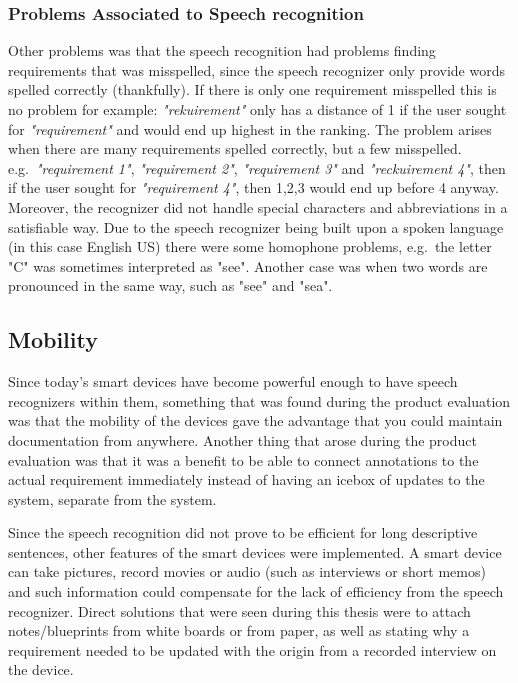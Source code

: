 \subsubsection{Problems Associated to Speech recognition}
Other problems was that the speech recognition had problems finding requirements that was misspelled, since the speech recognizer only provide words spelled correctly (thankfully). If there is only one requirement misspelled this is no problem for example: \emph{"re\emph{k}uirement"} only has a distance of 1 if the user sought for \emph{"requirement"} and would end up highest in the ranking. The problem arises when there are many requirements spelled correctly, but a few misspelled. e.g.\ \emph{"requirement 1"}, \emph{"requirement 2"}, \emph{"requirement 3"} and \emph{"re\emph{ck}uirement 4"}, then if the user sought for \emph{"requirement 4"}, then 1,2,3 would end up before 4 anyway. Moreover, the recognizer did not handle special characters and abbreviations in a satisfiable way. Due to the speech recognizer being built upon a spoken language (in this case English US) there were some homophone problems, e.g.\ the letter "C" was sometimes interpreted as "see". Another case was when two words are pronounced in the same way, such as "see" and "sea".

\subsection{Mobility}
Since today's smart devices have become powerful enough to have speech recognizers within them, something that was found during the product evaluation was that the mobility of the devices gave the advantage that you could maintain documentation from anywhere. Another thing that arose during the product evaluation was that it was a benefit to be able to connect annotations to the actual requirement immediately instead of having an icebox of updates to the system, separate from the system.

Since the speech recognition did not prove to be efficient for long descriptive sentences, other features of the smart devices were implemented. A smart device can take pictures, record movies or audio (such as interviews or short memos) and such information could compensate for the lack of efficiency from the speech recognizer. Direct solutions that were seen during this thesis were to attach notes/blueprints from white boards or from paper, as well as stating why a requirement needed to be updated with the origin from a recorded interview on the device. 


